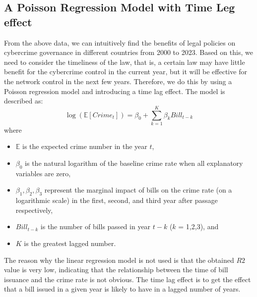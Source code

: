 \subsection{A Poisson Regression Model with Time Leg effect}\label{subsec:a-poisson-regression-model-with-time-leg-effect} %
    From the above data,
    we can intuitively find the benefits of legal policies on cybercrime governance in different countries from 2000 to 2023.
    Based on this, we need to consider the timeliness of the law, that is,
    a certain law may have little benefit for the cybercrime control in the current year,
    but it will be effective for the network control in the next few years.
    Therefore, we do this by using a Poisson regression model and introducing a time lag effect.
    The model is described as:
    \begin{equation}
        \log(\mathbb{E}[Crime_t]) = \beta_0 + \sum_{k=1}^{K} \beta_k Bill_{t-k}\label{eq:4-5-1}
    \end{equation}
    where
    \begin{itemize}
        \item \(\mathbb{E}\) is the expected crime number in the year \(t\),
        \item \(\beta_0\) is the natural logarithm of the baseline crime rate when all explanatory variables are zero,
        \item \(\beta_1, \beta_2, \beta_3\) represent the marginal impact of bills on the crime rate (on a logarithmic scale)
            in the first, second, and third year after passage respectively,
        \item \(Bill_{t-k}\) is the number of bills passed in year \(t-k\) (\(k\) = 1,2,3), and
        \item \(K\) is the greatest lagged number.
    \end{itemize}

    The reason why the linear regression model is not used is that the obtained \(R2\) value is very low,
    indicating that the relationship between the time of bill issuance and the crime rate is not obvious.
    The time lag effect is to get the effect that a bill issued in a given year is likely to have in a lagged number of years.

